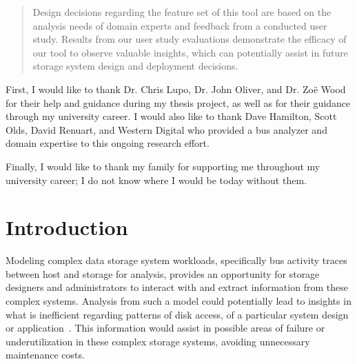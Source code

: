 \documentclass[12pt]{ucthesis}
\begin{document}
\begin{frontmatter}
\begin{abstract}
Design decisions regarding the feature set of this tool are based on the analysis needs of domain experts and feedback from a conducted user study. Results from our user study evaluations demonstrate the efficacy of our tool to observe valuable insights, which can potentially assist in future storage system design and deployment decisions.

\end{abstract}

\begin{acknowledgements}

First, I would like to thank Dr. Chris Lupo, Dr. John Oliver, and Dr. Zo\"{e} Wood for their help and guidance during my thesis project, as well as for their guidance through my university career. I would also like to thank Dave Hamilton, Scott Olds, David Renuart, and Western Digital who provided a bus analyzer and domain expertise to this ongoing research effort.

Finally, I would like to thank my family for supporting me throughout my university career; I do not know where I would be today without them.

\end{acknowledgements}


\tableofcontents


\listoftables

\listoffigures

\end{frontmatter}

\pagestyle{plain}


\renewcommand{\baselinestretch}{1.66}



\chapter{Introduction}
\label{intro}

Modeling complex data storage system workloads, specifically bus activity traces between host and storage for analysis, provides an opportunity for storage designers and administrators to interact with and extract information from these complex systems. Analysis from such a model could potentially lead to insights in what is inefficient regarding patterns of disk access, of a particular system design or application~\cite{internal:understanding}. This information would assist in possible areas of failure or underutilization in these complex storage systems, avoiding unnecessary maintenance costs.
\end{document}
